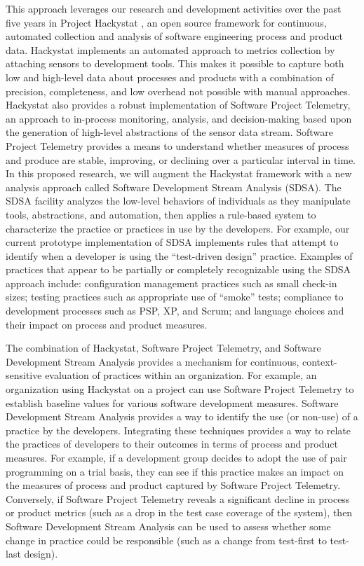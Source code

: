 This approach leverages our research and development activities over the
past five years in Project Hackystat \cite{Hackystat}, an open source
framework for continuous, automated collection and analysis of software
engineering process and product data.  Hackystat implements an automated
approach to metrics collection by attaching sensors to development
tools. This makes it possible to capture both low and high-level data about
processes and products with a combination of precision, completeness, and
low overhead not possible with manual approaches. Hackystat also provides a
robust implementation of Software Project Telemetry, an approach to
in-process monitoring, analysis, and decision-making based upon the
generation of high-level abstractions of the sensor data stream.  Software
Project Telemetry provides a means to understand whether measures of
process and produce are stable, improving, or declining over a particular
interval in time. In this proposed research, we will augment the Hackystat
framework with a new analysis approach called Software Development Stream
Analysis (SDSA). The SDSA facility analyzes the low-level behaviors of
individuals as they manipulate tools, abstractions, and automation, then
applies a rule-based system to characterize the practice or practices in
use by the developers.  For example, our current prototype implementation
of SDSA implements rules that attempt to identify when a developer is using
the ``test-driven design'' practice. Examples of practices that appear to
be partially or completely recognizable using the SDSA approach include:
configuration management practices such as small check-in sizes; testing
practices such as appropriate use of ``smoke'' tests; compliance to
development processes such as PSP, XP, and Scrum; and language choices and
their impact on process and product measures.
 
The combination of Hackystat, Software Project Telemetry, and Software
Development Stream Analysis provides a mechanism for continuous,
context-sensitive evaluation of practices within an organization.  For
example, an organization using Hackystat on a project can use Software
Project Telemetry to establish baseline values for various software
development measures.  Software Development Stream Analysis provides a way
to identify the use (or non-use) of a practice by the developers.  Integrating
these techniques provides a way to relate the practices of
developers to their outcomes in terms of process and product measures. 
For example, if a development group decides to adopt the use of pair
programming on a trial basis, they can see if this  practice makes an
impact on the measures of process and product captured by Software Project
Telemetry.  Conversely, if Software Project Telemetry reveals a significant
decline in process or product metrics (such as a drop in the test case
coverage of the system), then Software Development Stream Analysis can be
used to assess whether some change in practice could be responsible (such
as a change from test-first to test-last design).

